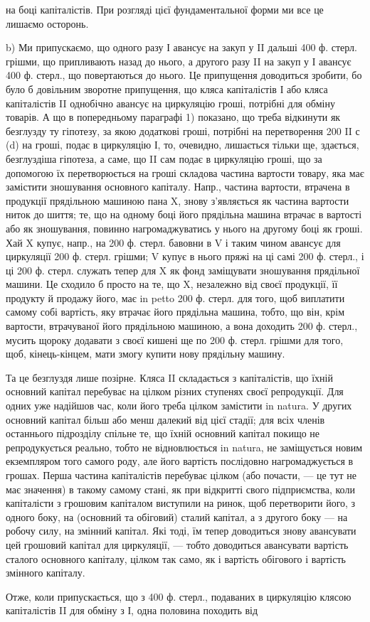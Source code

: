 \parcont{}  %
на боці капіталістів. При розгляді цієї фундаментальної форми ми все це
лишаємо осторонь.

b) Ми припускаємо, що одного разу І авансує на закуп у II дальші
400 ф. стерл. грішми, що припливають назад до нього, а другого разу
II на закуп у І авансує 400 ф. стерл., що повертаються до нього. Це
припущення доводиться зробити, бо було б довільним зворотне припущення,
що кляса капіталістів І або кляса капіталістів II однобічно авансує
на циркуляцію гроші, потрібні для обміну товарів. А що в попередньому
параграфі 1) показано, що треба відкинути як безглузду ту гіпотезу, за
якою додаткові гроші, потрібні на перетворення 200 II с (d) на гроші,
подає в циркуляцію І, то, очевидно, лишається тільки ще, здається, безглуздіша
гіпотеза, а саме, що II сам подає в циркуляцію гроші, що за допомогою
їх перетворюється на гроші складова частина вартости товару,
яка має замістити зношування основного капіталу. Напр., частина вартости,
втрачена в продукції прядільною машиною пана X, знову з’являється
як частина вартости ниток до шиття; те, що на одному боці його прядільна
машина втрачає в вартості або як зношування, повинно нагромаджуватись
у нього на другому боці як гроші. Хай X купує, напр., на
200 ф. стерл. бавовни в V і таким чином авансує для циркуляції 200 ф.
стерл. грішми; V купує в нього пряжі на ці самі 200 ф. стерл., і ці
200 ф. стерл. служать тепер для X як фонд заміщувати зношування прядільної
машини. Це сходило б просто на те, що X, незалежно від своєї
продукції, її продукту й продажу його, має in petto 200 ф. стерл. для
того, щоб виплатити самому собі вартість, яку втрачає його прядільна
машина, тобто, що він, крім вартости, втрачуваної його прядільною машиною,
а вона доходить 200 ф. стерл., мусить щороку додавати з своєї
кишені ще по 200 ф. стерл. грішми для того, щоб, кінець-кінцем, мати
змогу купити нову прядільну машину.

Та це безглуздя лише позірне. Кляса II складається з капіталістів,
що їхній основний капітал перебуває на цілком різних ступенях своєї
репродукції. Для одних уже надійшов час, коли його треба цілком замістити
in natura. У других основний капітал більш або менш далекий
від цієї стадії; для всіх членів останнього підрозділу спільне те, що їхній
основний капітал покищо не репродукується реально, тобто не відновлюється
in natura, не заміщується новим екземпляром того самого роду,
але його вартість послідовно нагромаджується в грошах. Перша частина
капіталістів перебуває цілком (або почасти, — це тут не має значення)
в такому самому стані, як при відкритті свого підприємства, коли капіталісти
з грошовим капіталом виступили на ринок, щоб перетворити його,
з одного боку, на (основний та обіговий) сталий капітал, а з другого
боку — на робочу силу, на змінний капітал. Які тоді, їм тепер доводиться
знову авансувати цей грошовий капітал для циркуляції, — тобто доводиться
авансувати вартість сталого основного капіталу, цілком так само, як і вартість
обігового і вартість змінного капіталу.

Отже, коли припускається, що з 400 ф. стерл., подаваних в циркуляцію
клясою капіталістів II для обміну з І, одна половина походить від
\parbreak{}  %
